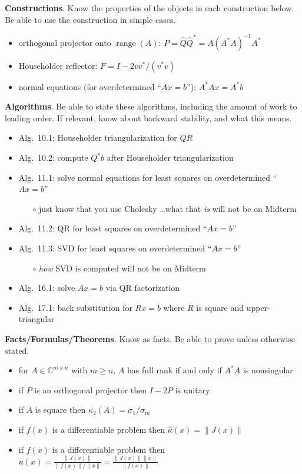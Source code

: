 \documentclass[11pt]{amsart}
\newcommand{\CC}{{\mathbb{C}}}
\newcommand{\range}{\operatorname{range}}
\newcommand{\ds}{\displaystyle}
\begin{document}
\medskip\noindent \textbf{Constructions}.  Know the properties of the objects in each construction below.  Be able to use the construction in simple cases.

\begin{itemize}
\item orthogonal projector onto $\range(A)$: $P=\hat Q\hat Q^* = A\left(A^* A\right)^{-1} A^*$
\item Householder reflector: $F = I - 2 v v^* / (v^* v)$
\item normal equations (for overdetermined ``$Ax=b$''): $A^* A x = A^* b$
\end{itemize}

\medskip\noindent \textbf{Algorithms}. Be able to state these algorithms, including the amount of work to leading order.  If relevant, know about backward stability, and what this means.
\begin{itemize}
\item Alg.~10.1: Householder triangularization for $QR$
\item Alg.~10.2: compute $Q^*b$ after Householder triangularization
\item Alg.~11.1: solve normal equations for least squares on overdetermined ``$Ax=b$''
    \begin{itemize}
    \item[$\circ$] just know that you use Cholesky \dots what that \emph{is} will not be on Midterm
    \end{itemize}
\item Alg.~11.2: QR for least squares on overdetermined ``$Ax=b$''
\item Alg.~11.3: SVD for least squares on overdetermined ``$Ax=b$''
    \begin{itemize}
    \item[$\circ$] \emph{how} SVD is computed will not be on Midterm
    \end{itemize}
\item Alg.~16.1: solve $Ax=b$ via QR factorization
\item Alg.~17.1: back substitution for $Rx=b$ where $R$ is square and upper-triangular
\end{itemize}

\noindent \textbf{Facts/Formulas/Theorems}.  Know as facts.  Be able to prove unless otherwise stated.
\begin{itemize}
\item for $A\in \CC^{m\times n}$ with $m\ge n$, $A$ has full rank if and only if $A^* A$ is nonsingular
\item if $P$ is an orthogonal projector then $I-2P$ is unitary
\item if $A$ is square then $\kappa_2(A)=\sigma_1/\sigma_m$
\item if $f(x)$ is a differentiable problem then $\hat\kappa(x) = \|J(x)\|$
\item if $f(x)$ is a differentiable problem then $\ds \kappa(x) = \frac{\|J(x)\|}{\|f(x)\|/\|x\|} = \frac{\|J(x)\|\|x\|}{\|f(x)\|}$
\end{itemize}
\end{document}
